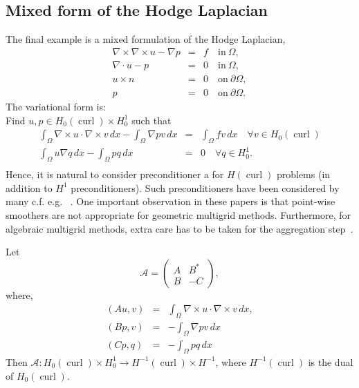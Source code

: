 \subsection{Mixed form of the Hodge Laplacian}
The final example is a mixed formulation
of the Hodge Laplacian, 
\begin{eqnarray}
\nabla \times \nabla \times u - \nabla p &=& f \quad \mbox{in} \ \Omega,    \label{mixed:hodge1} \\
\nabla \cdot u -p &=&  0 \quad \mbox{in} \ \Omega, \label{mixed:hodge2} \\
             u \times n &=&  0 \quad \mbox{on} \ \partial \Omega, \\  
             p          &=&  0 \quad \mbox{on} \ \partial \Omega.  
\end{eqnarray}
The variational form is: \\ 
Find $u, p \in H_0(\operatorname{curl}) \times H^1_0$ such that   
\begin{eqnarray}
\int_\Omega \nabla \times u \cdot \nabla \times v \, dx    
- \int_\Omega \nabla p v \, dx  &=& \int_\Omega f v \, dx  \quad \forall v \in H_0(\operatorname{curl}) \\
 \int_\Omega u  \nabla q  \, dx - \int_\Omega p q \, dx   &=& 0 \quad \forall q \in H^1_0 . \\
\end{eqnarray}
Hence, it is natural to consider preconditioner a for $H(\operatorname{curl})$ problems
(in addition to $H^1$ preconditioners). Such preconditioners have
been considered by many c.f. e.g. ~\cite{A-F-W-97Hdiv,A-F-W-00, Hip97, Hip99}.   
One important observation in these papers is that point-wise smoothers
are not appropriate for geometric multigrid methods. Furthermore, 
for algebraic multigrid methods, extra care has to be taken for the
aggregation step~\cite{ml-guide,maxwell-amg}. 

Let 
\[
\mathcal{A}  =
\begin{pmatrix} A & B^* \\ B & -C \end{pmatrix}, 
\]
where, 
\begin{eqnarray}
(A u, v) &=& \int_\Omega \nabla \times u \cdot \nabla \times v \, dx, \\    
(B p, v) &=&  - \int_\Omega \nabla p v \, dx \\
(C p, q) &=&  - \int_\Omega p q \, dx 
\end{eqnarray}
Then $\mathcal{A}: H_0(\operatorname{curl}) \times H^1_0 \rightarrow  H^{-1}(\operatorname{curl}) \times H^{-1}$, where   
$H^{-1}(\operatorname{curl})$ is the dual of   $H_0(\operatorname{curl})$.


